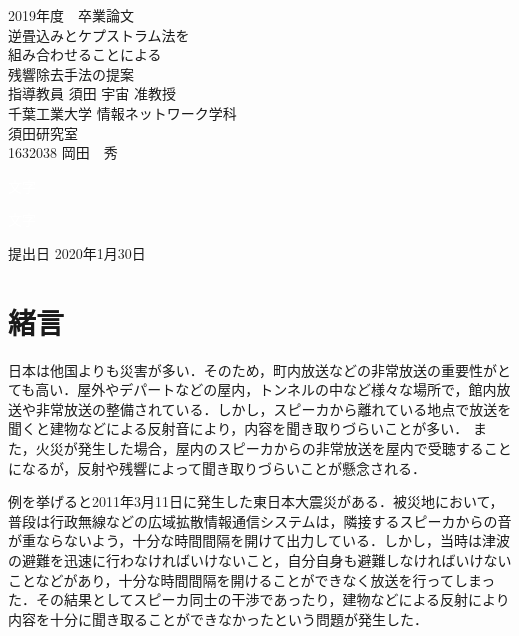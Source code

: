 \documentclass[a4j,11pt]{jsarticle}
\begin{document}
\setcounter{tocdepth}{3}
\thispagestyle{empty}
\clearpage
\addtocounter{page}{-1}
\begin{center}

\huge
2019年度　卒業論文\\[60pt]
\HUGE
逆畳込みとケプストラム法を\\
組み合わせることによる\\
残響除去手法の提案\\[65pt]
\huge
指導教員 須田 宇宙 准教授\\[40pt]
千葉工業大学 情報ネットワーク学科\\[10pt]
須田研究室\\[40pt]
1632038 \hspace{70pt} 岡田　秀\\[110pt]
\end{center}
\begin{flushright} 
\huge

\textcolor{white}{文字}

\textcolor{white}{文字}

提出日 2020年1月30日
\end{flushright}
\newpage
\thispagestyle{empty}
\clearpage
\addtocounter{page}{-1}
\large
\tableofcontents
\thispagestyle{empty}
\clearpage
\addtocounter{page}{-1}
\newpage
\listoftables
\listoffigures
\thispagestyle{empty}
\clearpage
\addtocounter{page}{-1}

\newpage

\section{緒言}
日本は他国よりも災害が多い．そのため，町内放送などの非常放送の重要性がとても高い\cite{oka1}．屋外やデパートなどの屋内，トンネルの中など様々な場所で，館内放送や非常放送の整備されている．しかし，スピーカから離れている地点で放送を聞くと建物などによる反射音により，内容を聞き取りづらいことが多い．
また，火災が発生した場合，屋内のスピーカからの非常放送を屋内で受聴することになるが，反射や残響によって聞き取りづらいことが懸念される．

例を挙げると2011年3月11日に発生した東日本大震災がある．被災地において，普段は行政無線などの広域拡散情報通信システムは，隣接するスピーカからの音が重ならないよう，十分な時間間隔を開けて出力している．しかし，当時は津波の避難を迅速に行わなければいけないこと，自分自身も避難しなければいけないことなどがあり，十分な時間間隔を開けることができなく放送を行ってしまった．その結果としてスピーカ同士の干渉であったり，建物などによる反射により内容を十分に聞き取ることができなかったという問題が発生した．
\end{document}
